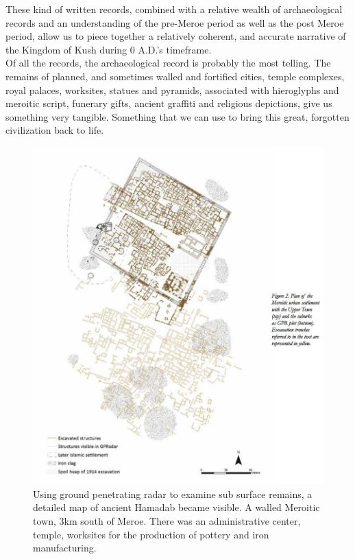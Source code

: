 \documentclass[a4paper,12pt]{scrreprt}
\begin{document}
These kind of written records, combined with a relative wealth of archaeological records and an understanding of the pre-Meroe period as well as the post Meroe period, allow us to piece together a relatively coherent, and accurate narrative of the Kingdom of Kush during 0 A.D.’s timeframe.\\

Of all the records, the archaeological record is probably the most telling. The remains of planned, and sometimes walled and fortified cities, temple complexes, royal palaces, worksites, statues and pyramids, associated with hieroglyphs and meroitic script, funerary gifts, ancient graffiti and religious depictions, give us something very tangible. Something that we can use to bring this great, forgotten civilization back to life.

\begin{figure}[H]
	\centering
	\includegraphics[width=\textwidth]{img/map_of_ancient_hamadab}
	\caption{Using ground penetrating radar to examine sub surface remains, a detailed map of ancient Hamadab became visible. A walled Meroitic town, 3km south of Meroe. There was an administrative center, temple, worksites for the production of pottery and iron manufacturing.}
\end{figure}
\end{document}
